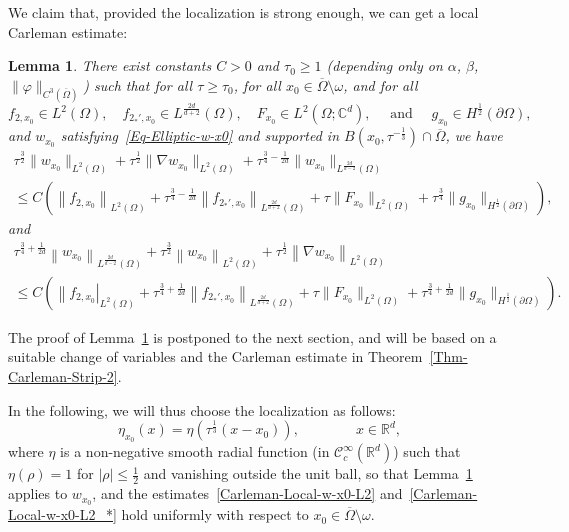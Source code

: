 \documentclass[10pt]{amsart}
\newtheorem{lemm}[theo]{Lemma}\newtheorem{prop}[theo]{Proposition}\newtheorem{coro}[theo]{Corollary}\newtheorem{conj}[theo]{Conjecture}
\theoremstyle{definition}\newtheorem{defi}[theo]{Definition}\newtheorem{rema}[theo]{Remark}\newtheorem{exam}[theo]{Example}\newtheorem{exem}[theo]{Example}\newtheorem{nota}[theo]{Notation}
\newcommand{\scC}{\mathscr{C}}
\newcommand*\R{\mathbb{R}}
\newcommand*\C{\mathbb{C}}
\renewcommand{\leq}{\leqslant}
\renewcommand{\geq}{\geqslant}
\begin{document}
We claim that, provided the localization is strong enough, we can get a local Carleman estimate:
\begin{lemm}\label{Lemma-Local-Carl-x-0}
There exist constants $C>0$ and $\tau_0 \geq 1$ (depending only on $\alpha$, $\beta$, $\| \varphi \|_{C^3(\overline\Omega)}$) such that for all $\tau \geq \tau_0$, for all $x_0 \in \overline\Omega \setminus \omega$, and for all
\begin{equation*}
f_{2,x_0} \in L^2(\Omega),
\quad f_{2_*',x_0} \in L^{\frac{2d}{d+2}}(\Omega),
\quad F_{x_0} \in L^2(\Omega; \C^{d}),
\quad\text{ and } \quad g_{x_0} \in H^{\frac{1}{2}}(\partial\Omega),
\end{equation*}
and $w_{x_0}$ satisfying~\eqref{Eq-Elliptic-w-x0} and supported in $B(x_0, \tau^{-\frac{1}{3}}) \cap \overline{\Omega}$, we have
\begin{multline}\label{Carleman-Local-w-x0-L2}
\tau^{\frac{3}{2}} \| w_{x_0} \|_{L^2(\Omega)} +
\tau^{\frac{1}{2}} \| \nabla w_{x_0} \|_{L^2(\Omega)} +
\tau^{\frac{3}{4}- \frac{1}{2d}} \| w_{x_0}\|_{L^{\frac{2d}{d-2}}(\Omega)}
\\
\leq C\left(
\left\| f_{2,x_0} \right\|_{L^2(\Omega)} +
\tau^{\frac{3}{4}- \frac{1}{2d}}
\left\| f_{2_*',x_0} \right\|_{L^{\frac{2d}{d+2}}(\Omega)} +
\tau \| F_{x_0} \|_{L^2(\Omega)} +
\tau^{\frac{3}{4}} \| g_{x_0} \|_{H^{\frac{1}{2}}(\partial\Omega)}
\right),
\end{multline}
and
\begin{multline}\label{Carleman-Local-w-x0-L2_*}
\tau^{\frac{3}{4}+ \frac{1}{2d}} \left\| w_{x_0} \right\|_{L^{\frac{2d}{d-2}}(\Omega)} +
\tau^{\frac{3}{2}} \left\| w_{x_0} \right\|_{L^2(\Omega)} +
\tau^{\frac{1}{2}} \left\| \nabla w_{x_0}\right\|_{L^2(\Omega)}
\\
\leq C\left(
\left\| f_{2,x_0}\right |_{L^2(\Omega)} +
\tau^{\frac{3}{4}+ \frac{1}{2d}} \left\| f_{2_*',x_0} \right\|_{L^{\frac{2d}{d+2}}(\Omega)} +
\tau \| F_{x_0} \|_{L^2(\Omega)} +
\tau^{\frac{3}{4}+ \frac{1}{2d}} \| g_{x_0} \|_{H^{\frac{1}{2}}(\partial\Omega)}
\right).
\end{multline}
\end{lemm}

The proof of Lemma~\ref{Lemma-Local-Carl-x-0} is postponed to the next section, and will be based on a suitable change of variables and the Carleman estimate in Theorem~\ref{Thm-Carleman-Strip-2}.

In the following, we will thus choose the localization as follows:
\begin{equation}\label{Choice-Localization}
\eta_{x_0}(x) = \eta\left(\tau^{\frac{1}{3}} (x-x_0)\right), \qquad \qquad x \in \R^{d},
\end{equation}
where $\eta$ is a non-negative smooth radial function (in $\scC^\infty_c(\R^d)$) such that $\eta(\rho) = 1$ for $|\rho| \leq \frac{1}{2}$ and vanishing outside the unit ball, so that Lemma~\ref{Lemma-Local-Carl-x-0} applies to $w_{x_0}$, and the estimates~\eqref{Carleman-Local-w-x0-L2} and~\eqref{Carleman-Local-w-x0-L2_*} hold uniformly with respect to $x_0 \in \overline\Omega \setminus \omega$.
\end{document}
